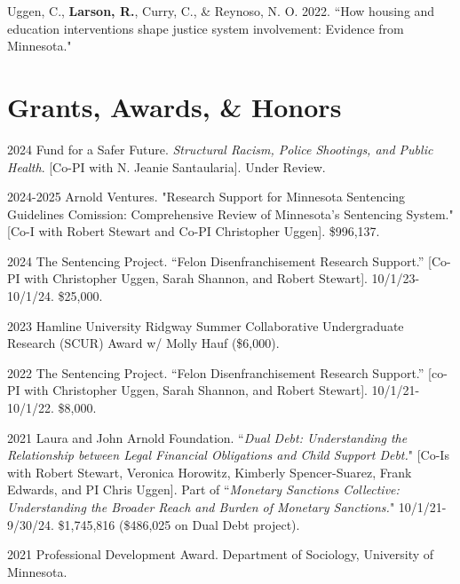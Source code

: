 \documentclass[letterpaper]{article}
\renewenvironment{itemize}{
  \begin{list}{}{
    \setlength{\leftmargin}{1.5em}
  }
}{
  \end{list}
}
\begin{document}
\begin{itemize}
\item Uggen, C., \textbf{Larson, R.}, Curry, C., \& Reynoso, N. O. 2022. ``How housing and education interventions shape justice system involvement: Evidence from Minnesota."


\end{itemize}

\section*{\textbf{Grants, Awards, \& Honors}}

\begin{itemize}

\item 2024 Fund for a Safer Future. \textit{Structural Racism, Police Shootings, and Public Health}. [Co-PI with N. Jeanie Santaularia]. Under Review.  

\item 2024-2025 Arnold Ventures. "Research Support for Minnesota Sentencing Guidelines Comission: Comprehensive Review of Minnesota's Sentencing System." [Co-I with Robert Stewart and Co-PI Christopher Uggen]. \$996,137. 

\item 2024 The Sentencing Project. “Felon Disenfranchisement Research Support.” [Co-PI with Christopher Uggen, Sarah Shannon, and Robert Stewart]. 10/1/23-10/1/24. \$25,000.

\item 2023 Hamline University Ridgway Summer Collaborative Undergraduate Research (SCUR) Award w/ Molly Hauf (\$6,000).

\item 2022 The Sentencing Project. “Felon Disenfranchisement Research Support.” [co-PI with Christopher Uggen, Sarah Shannon, and Robert Stewart]. 10/1/21-10/1/22. \$8,000.

\item 2021  Laura and John Arnold Foundation. ``\textit{Dual Debt: Understanding the Relationship between Legal Financial Obligations and Child Support Debt.}" [Co-Is with Robert Stewart, Veronica Horowitz, Kimberly Spencer-Suarez, Frank Edwards, and PI Chris Uggen]. Part of ``\textit{Monetary Sanctions Collective: Understanding the Broader Reach and Burden of Monetary Sanctions.}" 10/1/21-9/30/24. \$1,745,816 (\$486,025 on Dual Debt project).

\item 2021 Professional Development Award. Department of Sociology, University of Minnesota. 


\end{itemize}
\end{document}

